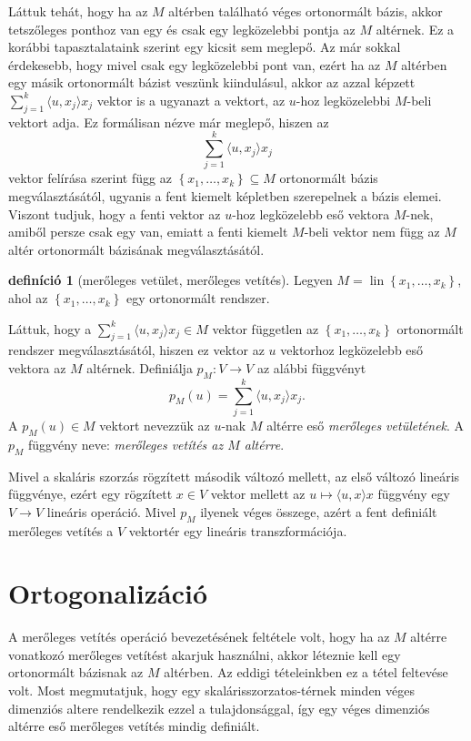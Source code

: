 \documentclass[a4paper, showtrims]{memoir}
\theoremstyle{plain}
\theoremstyle{remark}
\theoremstyle{definition}
\newtheorem{definition}[proposition]{definíció}
\DeclareMathOperator{\lin}{lin}
\newcommand{\ip}[2]{\langle#1,#2\rangle}
\begin{document}
Láttuk tehát, hogy ha az $M$ altérben található véges ortonormált bázis,
akkor tetszőleges ponthoz van egy és csak egy legközelebbi pontja az $M$ altérnek.
Ez a korábbi tapasztalataink szerint egy kicsit sem meglepő.
Az már sokkal érdekesebb, hogy mivel csak egy legközelebbi pont van, ezért
ha az $M$ altérben egy másik ortonormált bázist veszünk kiindulásul, akkor az azzal képzett
$\sum_{j=1}^k\ip{u}{x_j}x_j$ vektor is a ugyanazt a vektort, az $u$-hoz legközelebbi $M$-beli vektort adja.
Ez formálisan nézve már meglepő, hiszen az
\[
	\sum_{j=1}^k\ip{u}{x_j}x_j
\]
vektor felírása szerint függ az $\left\{ x_1,\ldots,x_k \right\}\subseteq M$ ortonormált bázis megválasztásától,
ugyanis a fent kiemelt képletben szerepelnek a bázis elemei.
Viszont tudjuk, hogy a fenti vektor az $u$-hoz legközelebb eső vektora $M$-nek, amiből persze csak egy van,
emiatt a fenti kiemelt $M$-beli vektor nem függ az $M$ altér ortonormált bázisának megválasztásától.
\begin{definition}[merőleges vetület, merőleges vetítés]
	Legyen $M=\lin\left\{ x_1,\ldots,x_k \right\}$,
	ahol az $\left\{ x_1,\ldots,x_k \right\}$ egy ortonormált rendszer.

	Láttuk, hogy a
	$\sum_{j=1}^k\ip{u}{x_j}x_j\in M$ vektor független
	az $\left\{ x_1,\ldots,x_k \right\}$ ortonormált rendszer megválasztásától,
	hiszen ez vektor az $u$ vektorhoz legközelebb eső vektora az $M$ altérnek.
	Definiálja $p_M:V\to V$ az alábbi függvényt
	\[
		p_M\left( u \right)=
		\sum_{j=1}^k\ip{u}{x_j}x_j.
	\]
	A $p_M\left( u \right)\in M$ vektort nevezzük az $u$-nak $M$ altérre eső \emph{merőleges vetületének}.
	A $p_M$ függvény neve: \emph{merőleges vetítés az $M$ altérre}.
\end{definition}
Mivel a skaláris szorzás rögzített második változó mellett,
az első változó lineáris függvénye,
ezért egy rögzített $x\in V$ vektor mellett az $u\mapsto\ip{u}{x}x$ függvény egy $V\to V$ lineáris operáció.
Mivel $p_M$ ilyenek véges összege, azért a fent definiált merőleges vetítés a $V$ vektortér egy lineáris transzformációja.
\section{Ortogonalizáció}
A merőleges vetítés operáció bevezetésének feltétele volt, hogy ha az $M$ altérre vonatkozó
merőleges vetítést akarjuk használni, akkor léteznie kell egy ortonormált bázisnak az $M$ altérben.
Az eddigi tételeinkben ez a tétel feltevése volt.
Most megmutatjuk, hogy egy skalárisszorzatos-térnek minden véges dimenziós altere rendelkezik ezzel a
tulajdonsággal, így egy véges dimenziós altérre eső merőleges vetítés mindig definiált.
\end{document}
